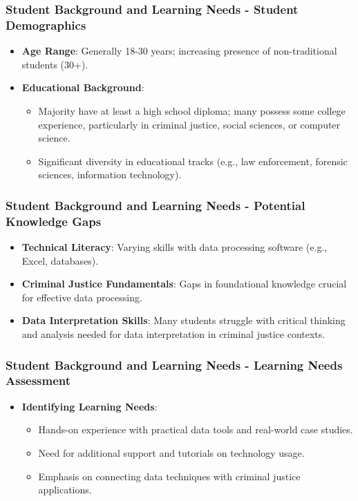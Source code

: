 \documentclass[aspectratio=169]{beamer}
\begin{document}
\begin{frame}[fragile]
    \frametitle{Student Background and Learning Needs - Student Demographics}
    \begin{itemize}
        \item \textbf{Age Range}: Generally 18-30 years; increasing presence of non-traditional students (30+).
        \item \textbf{Educational Background}: 
        \begin{itemize}
            \item Majority have at least a high school diploma; many possess some college experience, particularly in criminal justice, social sciences, or computer science.
            \item Significant diversity in educational tracks (e.g., law enforcement, forensic sciences, information technology).
        \end{itemize}
    \end{itemize}
\end{frame}

\begin{frame}[fragile]
    \frametitle{Student Background and Learning Needs - Potential Knowledge Gaps}
    \begin{itemize}
        \item \textbf{Technical Literacy}: Varying skills with data processing software (e.g., Excel, databases).
        \item \textbf{Criminal Justice Fundamentals}: Gaps in foundational knowledge crucial for effective data processing.
        \item \textbf{Data Interpretation Skills}: Many students struggle with critical thinking and analysis needed for data interpretation in criminal justice contexts.
    \end{itemize}
\end{frame}

\begin{frame}[fragile]
    \frametitle{Student Background and Learning Needs - Learning Needs Assessment}
    \begin{itemize}
        \item \textbf{Identifying Learning Needs}:
        \begin{itemize}
            \item Hands-on experience with practical data tools and real-world case studies.
            \item Need for additional support and tutorials on technology usage.
            \item Emphasis on connecting data techniques with criminal justice applications.
        \end{itemize}
    \end{itemize}
\end{frame}
\end{document}
